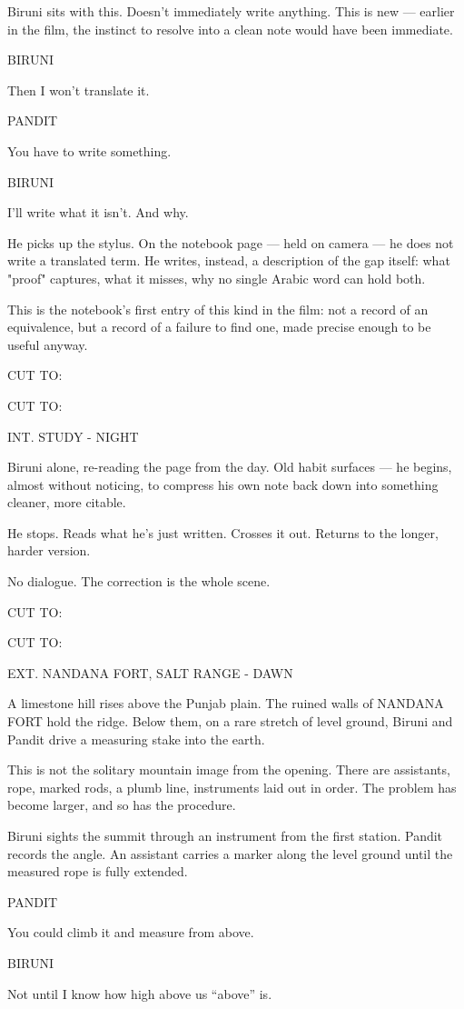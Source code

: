 \documentclass[12pt]{article}
\newcommand{\sceneheading}[1]{%
  \needspace{4\baselineskip}%
  \par\vspace{1\baselineskip}\noindent #1\par\vspace{0.6\baselineskip}%
}
\newcommand{\action}[1]{%
  \par\noindent #1\par\vspace{0.6\baselineskip}%
}
\newcommand{\transition}[1]{%
  \par\vspace{0.3\baselineskip}%
  \ifthenelse{\equal{#1}{FADE IN:}}%
    {\noindent #1\par}%
    {\noindent\hfill #1\par}%
  \vspace{0.6\baselineskip}%
}
\newcommand{\charcue}[1]{%
  \needspace{3\baselineskip}%
  \par\vspace{0.3\baselineskip}\noindent\hspace*{2.2in}#1\par%
}
\newenvironment{dialogue}{%
  \begin{list}{}{%
    \setlength{\leftmargin}{1.1in}%
    \setlength{\rightmargin}{1.6in}%
    \setlength{\listparindent}{0pt}%
    \setlength{\itemindent}{0pt}%
    \setlength{\parsep}{0pt}%
    \setlength{\itemsep}{0pt}%
    \setlength{\topsep}{0pt}%
  }\item[]%
}{%
  \end{list}\vspace{0.4\baselineskip}%
}
\begin{document}
\action{Biruni sits with this. Doesn't immediately write anything. This is new --- earlier in the film, the instinct to resolve into a clean note would have been immediate.}
\charcue{BIRUNI}
\begin{dialogue}
Then I won't translate it.\\
\end{dialogue}
\charcue{PANDIT}
\begin{dialogue}
You have to write something.\\
\end{dialogue}
\charcue{BIRUNI}
\begin{dialogue}
I'll write what it isn't. And why.\\
\end{dialogue}
\action{He picks up the stylus. On the notebook page --- held on camera --- he does not write a translated term. He writes, instead, a description of the gap itself: what "proof" captures, what it misses, why no single Arabic word can hold both.}
\action{This is the notebook's first entry of this kind in the film: not a record of an equivalence, but a record of a failure to find one, made precise enough to be useful anyway.}
\transition{CUT TO:}
\sceneheading{INT. STUDY - NIGHT}
\action{Biruni alone, re-reading the page from the day. Old habit surfaces --- he begins, almost without noticing, to compress his own note back down into something cleaner, more citable.}
\action{He stops. Reads what he's just written. Crosses it out. Returns to the longer, harder version.}
\action{No dialogue. The correction is the whole scene.}
\transition{CUT TO:}
\sceneheading{EXT. NANDANA FORT, SALT RANGE - DAWN}
\action{A limestone hill rises above the Punjab plain. The ruined walls of NANDANA FORT hold the ridge. Below them, on a rare stretch of level ground, Biruni and Pandit drive a measuring stake into the earth.}
\action{This is not the solitary mountain image from the opening. There are assistants, rope, marked rods, a plumb line, instruments laid out in order. The problem has become larger, and so has the procedure.}
\action{Biruni sights the summit through an instrument from the first station. Pandit records the angle. An assistant carries a marker along the level ground until the measured rope is fully extended.}
\charcue{PANDIT}
\begin{dialogue}
You could climb it and measure from above.\\
\end{dialogue}
\charcue{BIRUNI}
\begin{dialogue}
Not until I know how high above us ``above'' is.\\
\end{dialogue}
\end{document}

